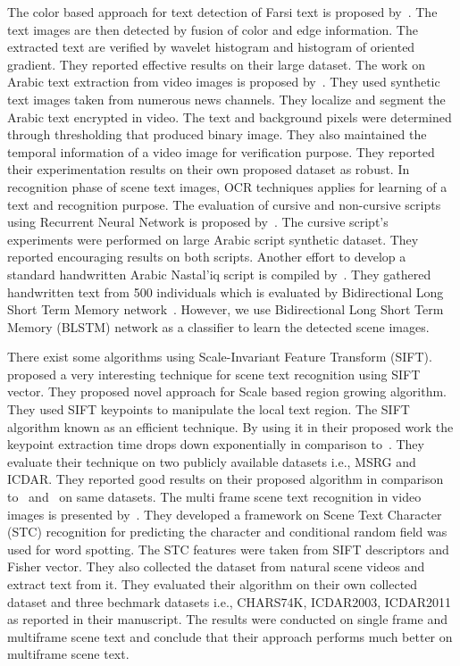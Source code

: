 \documentclass[conference]{IEEEtran}
\begin{document}
The color based approach for text detection of Farsi text is proposed by~\cite{ah}. 
The text images are then detected by fusion of color and edge information. The extracted text are verified by wavelet histogram and histogram of oriented gradient. They reported effective results on their large dataset.
The work on Arabic text extraction from video images is proposed by~\cite{at}. 
They used synthetic text images taken from numerous news channels. 
They localize and segment the Arabic text encrypted in video. The text and background pixels were determined through thresholding that produced binary image. They also maintained the temporal information of a video image for verification purpose. They reported their experimentation results on their own proposed dataset as robust.
In recognition phase of scene text images, OCR techniques applies for learning of a text and recognition purpose. The evaluation of cursive and non-cursive scripts using Recurrent Neural Network is proposed by~\cite{ec}. The cursive script's experiments were performed on large Arabic script synthetic dataset. They reported encouraging results on both scripts. Another effort to develop a standard handwritten Arabic Nastal'iq script is compiled by~\cite{ucom}.
They gathered handwritten text from 500 individuals which is evaluated by Bidirectional Long Short Term Memory network~\cite{hu}. However, we use Bidirectional Long Short Term  Memory (BLSTM) network as a classifier to learn the detected scene images.

There exist some algorithms using Scale-Invariant Feature Transform (SIFT).~\cite{sift} proposed a very interesting technique for scene text recognition using SIFT vector. They proposed novel approach for Scale based region growing algorithm.  They used SIFT keypoints to manipulate the local text region. The SIFT algorithm known as an efficient technique. By using it in their proposed work the keypoint  extraction time drops down exponentially in comparison to~\cite{at}. They evaluate their technique on two publicly available datasets i.e., MSRG and ICDAR. They reported good results on their proposed algorithm in comparison to~\cite{cvpr} and~\cite{icip} on same datasets. 
The multi frame scene text recognition in video images is presented by~\cite{icme}. 
They developed a framework on Scene Text Character (STC) recognition for predicting the character and conditional random field was used for word spotting. The STC features were taken from SIFT descriptors and Fisher vector. 
They also collected the dataset from natural scene videos and extract text from it. They evaluated their algorithm on their own collected dataset and three bechmark datasets i.e., CHARS74K, ICDAR2003, ICDAR2011 as reported in their manuscript. The results were conducted on single frame and multiframe scene text and conclude that their approach performs much better on multiframe scene text. 
	
\end{document}
